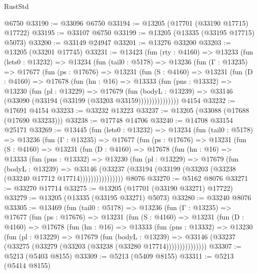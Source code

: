 \begin{lexlean}{RustStd}
\begin{coremodule}
    @6750
@33190 := @33096 @6750
@33194 := @13205 (@17701 (@33190 @17715) @17722)
@33195 := @33107 @6750
@33199 := @13205 (@13335 (@33195 @17715) @5073)
@33200 := @33149 @24947
@33201 := @13276 @33200
@33203 := @13205 (@33201 @17745)
@33231 := @13423
    (fun (rty : @4160) =>
    @13233
      (fun (lets0 : @13232) =>
      @13234
        (fun (tail0 : @5178) =>
        @13236
          (fun (Γ : @13235) =>
          @17677
            (fun (ps : @17676) =>
            @13231
              (fun (S : @4160) =>
              @13231
                (fun (D : @4160) =>
                @17678
                  (fun (hn : @16) =>
                  @13333
                    (fun (pns : @13332) =>
                    @13230
                      (fun (pl : @13229) =>
                      @17679
                        (fun (bodyL : @13239) =>
                        @33146 (@33090 (@33194 (@33199 (@33203 @33159)))))))))))))))
    @4154
@33232 := @17691 @4154
@33233 := @33232 @13223
@33237 := @13205 (@33088 (@17688 (@17690 @33233)))
@33238 := @17748 @14706
@33240 := @14708 @33154 @25171
@33269 := @13445
    (fun (lets0 : @13232) =>
    @13234
      (fun (tail0 : @5178) =>
      @13236
        (fun (Γ : @13235) =>
        @17677
          (fun (ps : @17676) =>
          @13231
            (fun (S : @4160) =>
            @13231
              (fun (D : @4160) =>
              @17678
                (fun (hn : @16) =>
                @13333
                  (fun (pns : @13332) =>
                  @13230
                    (fun (pl : @13229) =>
                    @17679
                      (fun (bodyL : @13239) =>
                      @33146
                        (@33237
                          (@33194 (@33199 (@33203 (@33238 (@33240 @17712 @17714))))))))))))))))
    @8076
@33270 := @5162 @8076
@33271 := @33270 @17714
@33275 := @13205 (@17701 (@33190 @33271) @17722)
@33279 := @13205 (@13335 (@33195 @33271) @5073)
@33280 := @33240 @8076
@33305 := @13469
    (fun (tail0 : @5178) =>
    @13236
      (fun (Γ : @13235) =>
      @17677
        (fun (ps : @17676) =>
        @13231
          (fun (S : @4160) =>
          @13231
            (fun (D : @4160) =>
            @17678
              (fun (hn : @16) =>
              @13333
                (fun (pns : @13332) =>
                @13230
                  (fun (pl : @13229) =>
                  @17679
                    (fun (bodyL : @13239) =>
                    @33146 (@33237 (@33275 (@33279 (@33203 (@33238 (@33280 @17714)))))))))))))))
@33307 := @5213 (@5403 @8155)
@33309 := @5213 (@5409 @8155)
@33311 := @5213 (@5414 @8155)

\end{coremodule}
\end{lexlean}
